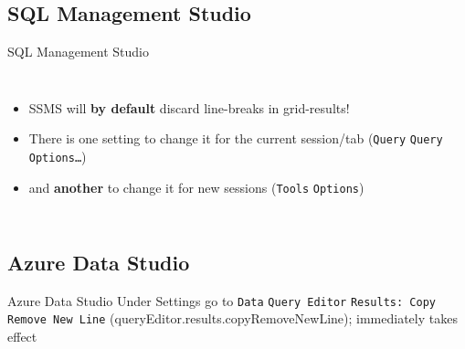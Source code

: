\documentclass[english,aspectratio=169]{beamer}
\begin{document}
\subsection[SSMS]{SQL Management Studio}
\begin{frame}{SQL Management Studio}
\begin{columns}
        \begin{itemize}
        \item<1| only@1> SSMS will \textbf{by default} discard line-breaks in grid-results!
        \item<2-> There is one setting to change it for the current session/tab (\texttt{Query} \textrightarrow{} \texttt{Query Options…})
        \item<3-> and \textbf{another} to change it for new sessions (\texttt{Tools} \textrightarrow{} \texttt{Options})
        \end{itemize}
        \begin{center}
        \end{center}
    \end{columns}
\end{frame}

\subsection[ADS]{Azure Data Studio}
\begin{frame}{Azure Data Studio}
    Under Settings go to \texttt{Data} \textrightarrow{} \texttt{Query Editor} \textrightarrow{} \texttt{Results: Copy Remove New Line} (queryEditor.results.copyRemoveNewLine); immediately takes effect

    \begin{center}
    \end{center}
\end{frame}
\end{document}
